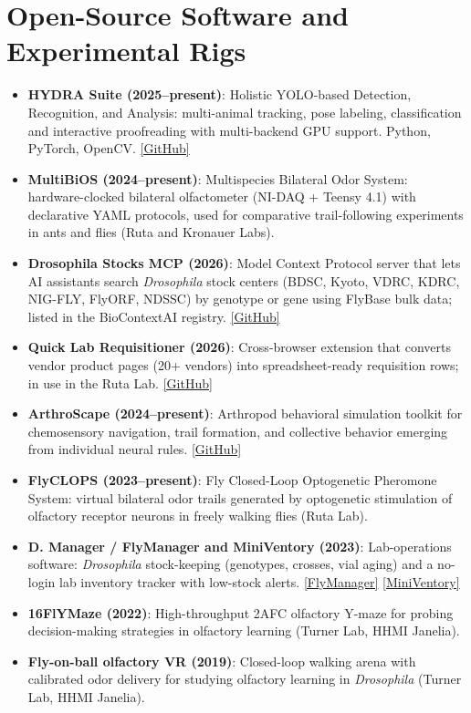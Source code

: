 \documentclass[letterpaper,9pt]{article}
\newcommand{\resumeItem}[2]{
  \item\small{
    \textbf{#1}{: #2 \vspace{-2pt}}
  }
}
\newcommand{\resumeSubItem}[2]{\resumeItem{#1}{#2}\vspace{-4pt}}
\newcommand{\resumeSubHeadingListStart}{\begin{itemize}[leftmargin=*]}
\newcommand{\resumeSubHeadingListEnd}{\end{itemize}}
\begin{document}
\section{Open-Source Software and Experimental Rigs}
\resumeSubHeadingListStart
    \resumeSubItem{HYDRA Suite (2025--present)}
      {Holistic YOLO-based Detection, Recognition, and Analysis: multi-animal tracking, pose labeling, classification and interactive proofreading with multi-backend GPU support. Python, PyTorch, OpenCV. \href{https://github.com/neurorishika/hydra-suite}{[GitHub]}}
    \resumeSubItem{MultiBiOS (2024--present)}
      {Multispecies Bilateral Odor System: hardware-clocked bilateral olfactometer (NI-DAQ + Teensy 4.1) with declarative YAML protocols, used for comparative trail-following experiments in ants and flies (Ruta and Kronauer Labs).}
    \resumeSubItem{Drosophila Stocks MCP (2026)}
      {Model Context Protocol server that lets AI assistants search \textit{Drosophila} stock centers (BDSC, Kyoto, VDRC, KDRC, NIG-FLY, FlyORF, NDSSC) by genotype or gene using FlyBase bulk data; listed in the BioContextAI registry. \href{https://github.com/neurorishika/drosophila-stocks-mcp}{[GitHub]}}
    \resumeSubItem{Quick Lab Requisitioner (2026)}
      {Cross-browser extension that converts vendor product pages (20+ vendors) into spreadsheet-ready requisition rows; in use in the Ruta Lab. \href{https://github.com/rutalaboratory/quick-lab-requisitioner}{[GitHub]}}
    \resumeSubItem{ArthroScape (2024--present)}
      {Arthropod behavioral simulation toolkit for chemosensory navigation, trail formation, and collective behavior emerging from individual neural rules. \href{https://github.com/neurorishika/ArthroScape}{[GitHub]}}
    \resumeSubItem{FlyCLOPS (2023--present)}
      {Fly Closed-Loop Optogenetic Pheromone System: virtual bilateral odor trails generated by optogenetic stimulation of olfactory receptor neurons in freely walking flies (Ruta Lab).}
    \resumeSubItem{D. Manager / FlyManager and MiniVentory (2023)}
      {Lab-operations software: \textit{Drosophila} stock-keeping (genotypes, crosses, vial aging) and a no-login lab inventory tracker with low-stock alerts. \href{https://github.com/neurorishika/FlyManager}{[FlyManager]} \href{https://github.com/neurorishika/MiniVentory}{[MiniVentory]}}
    \resumeSubItem{16FlYMaze (2022)}
      {High-throughput 2AFC olfactory Y-maze for probing decision-making strategies in olfactory learning (Turner Lab, HHMI Janelia).}
    \resumeSubItem{Fly-on-ball olfactory VR (2019)}
      {Closed-loop walking arena with calibrated odor delivery for studying olfactory learning in \textit{Drosophila} (Turner Lab, HHMI Janelia).}
\resumeSubHeadingListEnd
\end{document}
